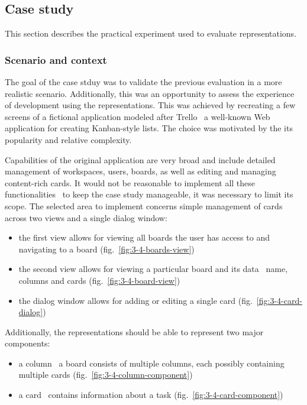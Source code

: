 \subsection{Case study}\label{subsec:case-study}
This section describes the practical experiment used to evaluate representations.

\subsubsection{Scenario and context}
The goal of the case stduy was to validate the previous evaluation in a more realistic scenario.
Additionally, this was an opportunity to assess the experience of development using the representations.
This was achieved by recreating a few screens of a fictional application modeled after Trello \textendash\ a well-known Web application for creating Kanban-style lists.
The choice was motivated by the its popularity and relative complexity.

Capabilities of the original application are very broad and include detailed management of workspaces, users, boards, as well as editing and managing content-rich cards.
It would not be reasonable to implement all these functionalities \textendash\ to keep the case study manageable, it was necessary to limit its scope.
The selected area to implement concerns simple management of cards across two views and a single dialog window:
\begin{itemize}
    \item the first view allows for viewing all boards the user has access to and navigating to a board (fig.~\ref{fig:3-4-boards-view})
    \item the second view allows for viewing a particular board and its data \textendash\ name, columns and cards (fig.~\ref{fig:3-4-board-view})
    \item the dialog window allows for adding or editing a single card (fig.~\ref{fig:3-4-card-dialog})
\end{itemize}
Additionally, the representations should be able to represent two major components:
\begin{itemize}
    \item a column \textendash\ a board consists of multiple columns, each possibly containing multiple cards (fig.~\ref{fig:3-4-column-component})
    \item a card \textendash\ contains information about a task (fig.~\ref{fig:3-4-card-component})
\end{itemize}

